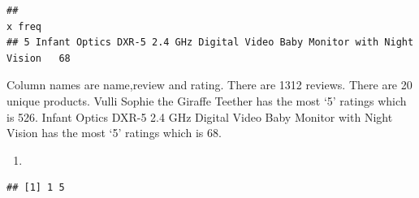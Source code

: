 \documentclass[
]{article}
\newenvironment{Shaded}{\begin{snugshade}}{\end{snugshade}}
\newcommand{\CommentTok}[1]{\textcolor[rgb]{0.56,0.35,0.01}{\textit{#1}}}
\newcommand{\DecValTok}[1]{\textcolor[rgb]{0.00,0.00,0.81}{#1}}
\newcommand{\FunctionTok}[1]{\textcolor[rgb]{0.00,0.00,0.00}{#1}}
\newcommand{\NormalTok}[1]{#1}
\newcommand{\OtherTok}[1]{\textcolor[rgb]{0.56,0.35,0.01}{#1}}
\newcommand{\SpecialCharTok}[1]{\textcolor[rgb]{0.00,0.00,0.00}{#1}}
\providecommand{\tightlist}{%
  \setlength{\itemsep}{0pt}\setlength{\parskip}{0pt}}
\begin{document}
\begin{Shaded}
\end{Shaded}

\begin{verbatim}
##                                                                          x freq
## 5 Infant Optics DXR-5 2.4 GHz Digital Video Baby Monitor with Night Vision   68
\end{verbatim}

Column names are name,review and rating. There are 1312 reviews. There
are 20 unique products. Vulli Sophie the Giraffe Teether has the most
`5' ratings which is 526. Infant Optics DXR-5 2.4 GHz Digital Video Baby
Monitor with Night Vision has the most `5' ratings which is 68.

\begin{enumerate}
\def\labelenumi{(\alph{enumi})}
\setcounter{enumi}{1}
\tightlist
\item
\end{enumerate}

\begin{Shaded}
\end{Shaded}

\begin{verbatim}
## [1] 1 5
\end{verbatim}

\begin{Shaded}
\end{Shaded}
\end{document}
